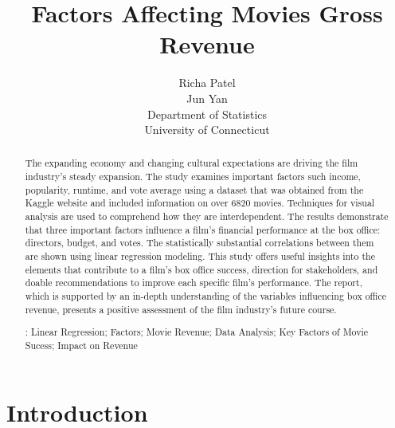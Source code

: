 \documentclass[12pt]{article}
\title{Factors Affecting Movies Gross Revenue}
\author{Richa Patel\\
  Jun Yan\\[2ex]
  Department of Statistics\\
  University of Connecticut\\
}
\begin{document}
\maketitle
\doublespace

\begin{abstract}

The expanding economy and changing cultural expectations are driving the film industry's 
steady expansion. The study examines important factors such income, popularity,
runtime, and vote average using a dataset that was obtained from the Kaggle website and 
included information on over 6820 movies. Techniques for visual analysis are used to 
comprehend how they are interdependent. The results demonstrate that three important 
factors influence a film's financial performance at the box office: directors, budget,
and votes. The statistically substantial correlations between them are shown using 
linear regression modeling. This study offers useful insights into the elements that 
contribute to a film's box office success, direction for stakeholders, and doable
recommendations to improve each specific film's performance. The report, which is supported 
by an in-depth understanding of the variables influencing box office revenue, presents
a positive assessment of the film industry's future course.


\bigskip
{}:
Linear Regression; 
Factors;
Movie Revenue;
Data Analysis;
Key Factors of Movie Sucess;
Impact on Revenue

\end{abstract}


\section{Introduction}
\label{sec:intro}
\end{document}
